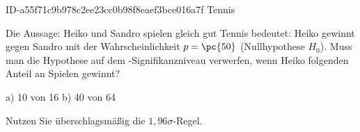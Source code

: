 \begin{exercise}
      {ID-a55f71c9b978c2ee23cc0b98f8eaef3bce016a7f}
      {Tennis}
  \ifproblem\problem\par
    Die Aussage: \glqq Heiko und Sandro spielen gleich gut Tennis\grqq{}
    bedeutet: Heiko gewinnt gegen Sandro mit der Wahrscheinlichkeit $p=\pc{50}$
    (Nullhypothese $H_0$). Muss man die Hypothese auf dem -Signifikanzniveau
    verwerfen, wenn Heiko folgenden Anteil an Spielen gewinnt?
    \begin{center}
      a) 10 von 16
      \qquad\qquad\qquad
      b) 40 von 64
    \end{center}
    Nutzen Sie überschlagsmäßig die $1,\!96\sigma$-Regel.
  \fi
\end{exercise}

